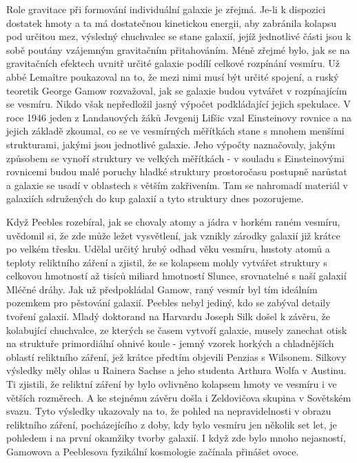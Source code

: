   Role gravitace při formování individuální galaxie je zřejmá. Je-li k dispozici dostatek hmoty a ta
  má dostatečnou kinetickou energii, aby zabránila kolapsu pod určitou mez, výsledný chuchvalec se
  stane galaxií, jejíž jednotlivé části jsou k sobě poutány vzájemným gravitačním přitahováním. Méně
  zřejmé bylo, jak se na gravitačních efektech uvnitř určité galaxie podílí celkové rozpínání
  vesmíru. Už abbé Lemaître poukazoval na to, že mezi nimi musí být určité spojení, a ruský teoretik
  George Gamow rozvažoval, jak se galaxie budou vytvářet v rozpínajícím se vesmíru. Nikdo však
  nepředložil jasný výpočet podkládající jejich spekulace. V roce 1946 jeden z Landauových žáků
  Jevgenij Lifšic vzal Einsteinovy rovnice a na jejich základě zkoumal, co se ve vesmírných
  měřítkách stane s mnohem menšími strukturami, jakými jsou jednotlivé galaxie. Jeho výpočty
  naznačovaly, jakým způsobem se vynoří struktury ve velkých měřítkách - v souladu s Einsteinovými
  rovnicemi budou malé poruchy hladké struktury prostoročasu postupně narůstat a galaxie se usadí v
  oblastech s větším zakřivením. Tam se nahromadí materiál v galaxiích sdružených do kup galaxií a
  tyto struktury dnes pozorujeme. 
  
  Když Peebles rozebíral, jak se chovaly atomy a jádra v horkém raném vesmíru, uvědomil si, že zde
  může ležet vysvětlení, jak vznikly zárodky galaxií již krátce po velkém třesku. Udělal určitý
  hrubý odhad věku vesmíru, hustoty atomů a teploty reliktního záření a zjistil, že se kolapsem
  mohly vytvářet struktury s celkovou hmotností až tisíců miliard hmotností Slunce, srovnatelné s
  naší galaxií Mléčné dráhy. Jak už předpokládal Gamow, raný vesmír byl tím ideálním pozemkem pro
  pěstování galaxií. Peebles nebyl jediný, kdo se zabýval detaily tvoření galaxií. Mladý doktorand
  na Harvardu Joseph Silk došel k závěru, že kolabující chuchvalce, ze kterých se časem vytvoří
  galaxie, musely zanechat otisk na struktuře primordiální ohnivé koule - jemný vzorek horkých a
  chladnějších oblastí reliktního záření, jež krátce předtím objevili Penzias s Wilsonem. Silkovy
  výsledky měly ohlas u Rainera Sachse a jeho studenta Arthura Wolfa v Austinu. Ti zjistili, že
  reliktní záření by bylo ovlivněno kolapsem hmoty ve vesmíru i ve větších rozměrech. A ke stejnému
  závěru došla i Zeldovičova skupina v Sovětském svazu. Tyto výsledky ukazovaly na to, že pohled na
  nepravidelnosti v obrazu reliktního záření, pocházejícího z doby, kdy bylo vesmíru jen několik set
  let, je pohledem i na první okamžiky tvorby galaxií. I když zde bylo mnoho nejasností, Gamowova a
  Peeblesova fyzikální kosmologie začínala přinášet ovoce. 
  
